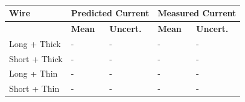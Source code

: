 \documentclass[12pt]{article}
\begin{document}
	\begin{table}
		\centering
		\begin{tabular}{|p{2cm}|p{1.5cm}|p{1.5cm}|p{1.5cm}|p{1.5cm}|}
			\hline
			\textbf{Wire}&\multicolumn{2}{p{2cm}|}{\bfseries Predicted Current}&\multicolumn{2}{p{2cm}|}{\bfseries Measured Current}\\
			\hline
			& \textbf{Mean} & \textbf{Uncert.} & \textbf{Mean} & \textbf{Uncert.} \\
			\hline
			Long + Thick&-&-&-&-\\
			\hline
			Short + Thick&-&-&-&-\\
			\hline
			Long + Thin&-&-&-&-\\
			\hline
			Short + Thin&-&-&-&-\\
			\hline
		\end{tabular}
		\caption{}
		\label{tab2}
	\end{table}
\end{document}
